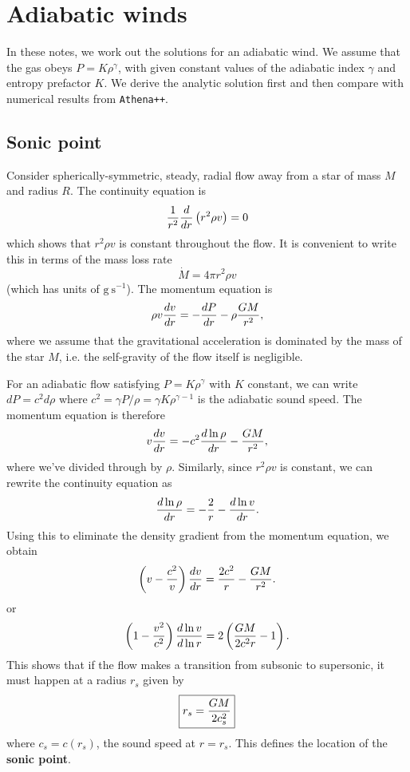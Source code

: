 \documentclass[preprint,12pt]{aastex}
\begin{document}
\section{Adiabatic winds}

In these notes, we work out the solutions for an adiabatic wind. We assume that the gas obeys $P = K \rho^\gamma$, with given constant values of the adiabatic index $\gamma$ and entropy prefactor $K$. We derive the analytic solution first and then compare with numerical results from \texttt{Athena++}.

\subsection{Sonic point}

Consider spherically-symmetric, steady, radial flow away from a star of mass $M$ and radius $R$. The continuity equation is
\begin{equation}
{1\over r^2}{d\over dr}\left(r^2\rho v\right) = 0
\end{equation}
which shows that $r^2\rho v$ is constant throughout the flow. It is convenient to write this in terms of the mass loss rate 
\begin{equation}
\dot{M} = 4\pi r^2 \rho v
\end{equation}
(which has units of $\mathrm{g\ s^{-1}}$). The momentum equation is
\begin{equation}
\rho v{dv\over dr} = -{dP\over dr}-\rho {GM\over r^2},
\end{equation}
where we assume that the gravitational acceleration is dominated by the mass of the star $M$, i.e. the self-gravity of the flow itself is negligible.

For an adiabatic flow satisfying $P=K\rho^\gamma$ with $K$ constant, we can write $dP = c^2 d\rho$ where $c^2 = \gamma P/\rho = \gamma K \rho^{\gamma-1}$ is the adiabatic sound speed. The momentum equation is therefore
\begin{equation}\label{eq:momentum}
v{dv\over dr} = -c^2{d\ln\rho\over dr}-{GM\over r^2},
\end{equation}
where we've divided through by $\rho$. Similarly, since $r^2\rho v$ is constant, we can rewrite the continuity equation as 
\begin{equation}
{d\ln\rho\over dr} = -{2\over r} -{d\ln v\over dr}.
\end{equation}
Using this to eliminate the density gradient from the momentum equation, we obtain
\begin{equation}
\left(v-{c^2\over v}\right){dv\over dr} = {2c^2\over r}-{GM\over r^2}.
\end{equation}
or
\begin{equation}
\left(1-{v^2\over c^2}\right){d\ln v\over d\ln r}=2\left({GM\over 2c^2r}-1\right).
\end{equation}
This shows that if the flow makes a transition from subsonic to supersonic, it must happen at a radius $r_s$ given by 
\begin{equation}
\boxed{
r_s = {GM\over 2c_s^2}
}
\end{equation}
where $c_s = c(r_s)$, the sound speed at $r=r_s$. This defines the location of the {\bf sonic point}.
\end{document}
